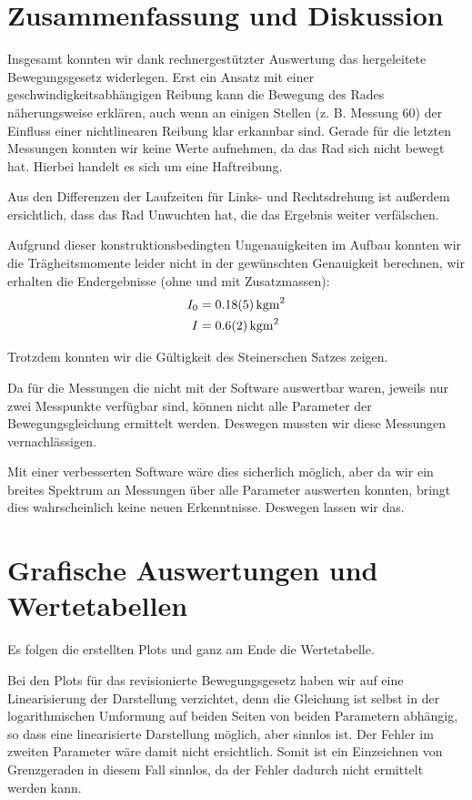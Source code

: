 \documentclass[a4paper,german,12pt,smallheadings]{scrartcl}
\begin{document}
\section{Zusammenfassung und Diskussion}
Insgesamt konnten wir dank rechnergestützter Auswertung das hergeleitete
Bewegungsgesetz widerlegen. Erst ein Ansatz mit einer
geschwindigkeitsabhängigen Reibung kann die Bewegung des Rades näherungsweise
erklären, auch wenn an einigen Stellen (z. B. Messung 60) der Einfluss einer
nichtlinearen Reibung klar erkannbar sind. Gerade für die letzten Messungen
konnten wir keine Werte aufnehmen, da das Rad sich nicht bewegt hat. Hierbei
handelt es sich um eine Haftreibung.

Aus den Differenzen der Laufzeiten für Links- und Rechtsdrehung ist außerdem
ersichtlich, dass das Rad Unwuchten hat, die das Ergebnis weiter verfälschen.

Aufgrund dieser konstruktionsbedingten Ungenauigkeiten im Aufbau konnten wir
die Trägheitsmomente leider nicht in der gewünschten Genauigkeit berechnen, wir
erhalten die Endergebnisse (ohne und mit Zusatzmassen):
\begin{align*}
  I_0 &= \SI{0.18+-0.05}{kg m^2} \\
  I   &= \SI{0.6+-0.2}{kg m^2}
\end{align*}

Trotzdem konnten wir die Gültigkeit des Steinerschen Satzes zeigen.

Da für die Messungen die nicht mit der Software auswertbar waren, jeweils nur
zwei Messpunkte verfügbar sind, können nicht alle Parameter der
Bewegungsgleichung ermittelt werden. Deswegen mussten wir diese Messungen
vernachlässigen.

Mit einer verbesserten Software wäre dies sicherlich möglich, aber da wir ein
breites Spektrum an Messungen über alle Parameter auswerten konnten, bringt
dies wahrscheinlich keine neuen Erkenntnisse. Deswegen lassen wir das.

\section{Grafische Auswertungen und Wertetabellen}
Es folgen die erstellten Plots und ganz am Ende die Wertetabelle.

Bei den Plots für das revisionierte Bewegungsgesetz haben wir auf eine
Linearisierung der Darstellung verzichtet, denn die Gleichung ist selbst in der
logarithmischen Umformung auf beiden Seiten von beiden Parametern abhängig, so
dass eine linearisierte Darstellung möglich, aber sinnlos ist. Der Fehler im
zweiten Parameter wäre damit nicht ersichtlich. Somit ist ein Einzeichnen von
Grenzgeraden in diesem Fall sinnlos, da der Fehler dadurch nicht ermittelt
werden kann.
\end{document}
